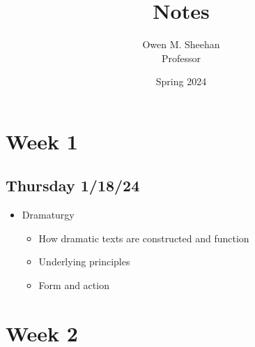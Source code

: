 \documentclass[12pt]{article}
\title{\class{} Notes}
\author{Owen M. Sheehan\\Professor \prof{}}
\date{Spring 2024}
\begin{document}
\maketitle
\tableofcontents
\newpage

    \section{Week 1}
        \subsection{Thursday 1/18/24}
        \bigskip
            \begin{itemize}
                \item Dramaturgy
                \begin{itemize}
                    \item How dramatic texts are constructed and function
                    \item Underlying principles
                    \item Form and action
                \end{itemize}
            \end{itemize}
    
    \section{Week 2}
\end{document}
